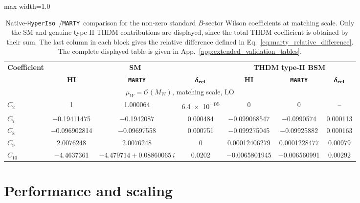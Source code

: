 \documentclass[preprint,11pt]{elsarticle}
\newcommand{\hi}{\texttt{HyperIso}}
\newcommand{\mty}{\texttt{MARTY}}
\begin{document}
\begin{table}[!ht]
\centering
\small
\setlength{\tabcolsep}{3pt}
\renewcommand{\arraystretch}{1.08}
\begin{adjustbox}{max width=1.0\textwidth}
\begin{tabular}{lcccccc}
\hline
\textbf{Coefficient} & \multicolumn{3}{c}{\textbf{SM}} & \multicolumn{3}{c}{\textbf{THDM type-II BSM}} \\
 & \textbf{HI} & \textbf{\mty} & \(\boldsymbol{\delta_{\rm rel}}\) & \textbf{HI} & \textbf{\mty} & \(\boldsymbol{\delta_{\rm rel}}\) \\
\hline
\multicolumn{7}{c}{\(\mu_W=\mathcal{O}(M_W)\), matching scale, LO} \\
\hline
\(C_{2}\) & \num{1} & \num{1.000064} & \num{6.4e-05} & \num{0} & \num{0} & \multicolumn{1}{c}{--} \\
\(C_{7}\) & \num{-0.19411475} & \num{-0.1942087} & \num{0.000484} & \num{-0.099068547} & \num{-0.0990574} & \num{0.000113} \\
\(C_{8}\) & \num{-0.096902814} & \num{-0.09697558} & \num{0.000751} & \num{-0.099275045} & \num{-0.09925882} & \num{0.000163} \\
\(C_{9}\) & \num{2.0076248} & \num{2.0076248} & \num{0} & \num{0.00012406279} & \num{0.0001228477} & \num{0.00979} \\
\(C_{10}\) & \num{-4.4637361} & \(\num{-4.479714}+\num{0.08860065}\,i\) & \num{0.0202} & \num{-0.0065801945} & \num{-0.006560991} & \num{0.00292} \\
\hline
\end{tabular}
\end{adjustbox}
\caption{Native-\hi~/\mty~comparison for the non-zero standard \(B\)-sector Wilson coefficients at matching scale.  Only the SM and genuine type-II THDM contributions are displayed, since the total THDM coefficient is obtained by their sum.  The last column in each block gives the relative difference defined in Eq.~\eqref{eq:marty_relative_difference}.  The complete displayed table is given in App.~\ref{app:extended_validation_tables}.}
\label{tab:comparison_marty_B}
\end{table}

\section{Performance and scaling}\label{sec:performance}
\end{document}
